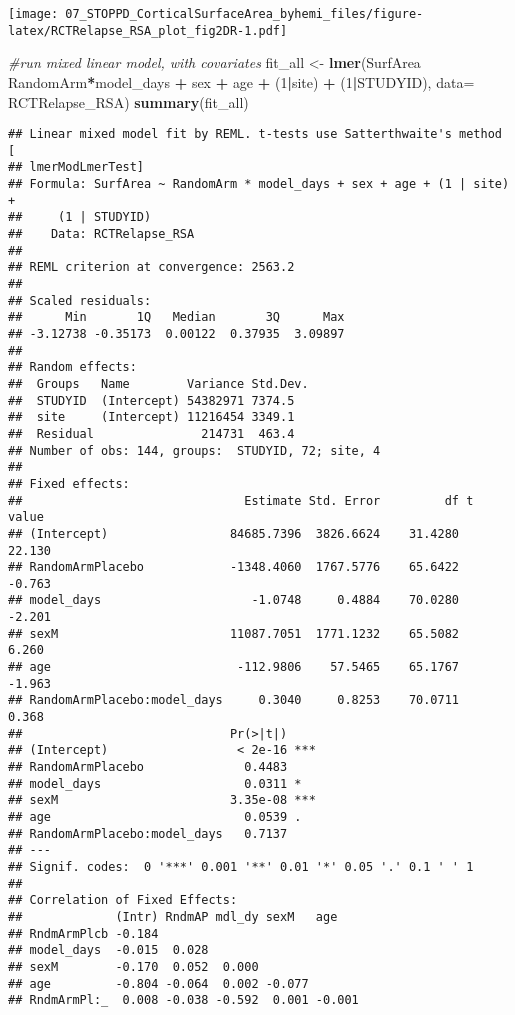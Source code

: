 \documentclass[]{article}
\newenvironment{Shaded}{\begin{snugshade}}{\end{snugshade}}
\newcommand{\KeywordTok}[1]{\textcolor[rgb]{0.13,0.29,0.53}{\textbf{#1}}}
\newcommand{\DataTypeTok}[1]{\textcolor[rgb]{0.13,0.29,0.53}{#1}}
\newcommand{\DecValTok}[1]{\textcolor[rgb]{0.00,0.00,0.81}{#1}}
\newcommand{\StringTok}[1]{\textcolor[rgb]{0.31,0.60,0.02}{#1}}
\newcommand{\CommentTok}[1]{\textcolor[rgb]{0.56,0.35,0.01}{\textit{#1}}}
\newcommand{\OperatorTok}[1]{\textcolor[rgb]{0.81,0.36,0.00}{\textbf{#1}}}
\newcommand{\NormalTok}[1]{#1}
\theoremstyle{definition}
\theoremstyle{definition}
\theoremstyle{definition}
\theoremstyle{remark}
\begin{document}
\texttt{[image: 07\_STOPPD\_CorticalSurfaceArea\_byhemi\_files/figure-latex/RCTRelapse\_RSA\_plot\_fig2DR-1.pdf]}

\begin{Shaded}
\begin{Highlighting}[]
\CommentTok{#run mixed linear model, with covariates}
\NormalTok{  fit_all <-}\StringTok{ }\KeywordTok{lmer}\NormalTok{(SurfArea }\OperatorTok{~}\StringTok{ }\NormalTok{RandomArm}\OperatorTok{*}\NormalTok{model_days }\OperatorTok{+}\StringTok{ }\NormalTok{sex }\OperatorTok{+}\StringTok{ }\NormalTok{age }\OperatorTok{+}\StringTok{ }\NormalTok{(}\DecValTok{1}\OperatorTok{|}\NormalTok{site) }\OperatorTok{+}\StringTok{ }\NormalTok{(}\DecValTok{1}\OperatorTok{|}\NormalTok{STUDYID), }\DataTypeTok{data=}\NormalTok{ RCTRelapse_RSA)}
  \KeywordTok{summary}\NormalTok{(fit_all)}
\end{Highlighting}
\end{Shaded}

\begin{verbatim}
## Linear mixed model fit by REML. t-tests use Satterthwaite's method [
## lmerModLmerTest]
## Formula: SurfArea ~ RandomArm * model_days + sex + age + (1 | site) +  
##     (1 | STUDYID)
##    Data: RCTRelapse_RSA
## 
## REML criterion at convergence: 2563.2
## 
## Scaled residuals: 
##      Min       1Q   Median       3Q      Max 
## -3.12738 -0.35173  0.00122  0.37935  3.09897 
## 
## Random effects:
##  Groups   Name        Variance Std.Dev.
##  STUDYID  (Intercept) 54382971 7374.5  
##  site     (Intercept) 11216454 3349.1  
##  Residual               214731  463.4  
## Number of obs: 144, groups:  STUDYID, 72; site, 4
## 
## Fixed effects:
##                               Estimate Std. Error         df t value
## (Intercept)                 84685.7396  3826.6624    31.4280  22.130
## RandomArmPlacebo            -1348.4060  1767.5776    65.6422  -0.763
## model_days                     -1.0748     0.4884    70.0280  -2.201
## sexM                        11087.7051  1771.1232    65.5082   6.260
## age                          -112.9806    57.5465    65.1767  -1.963
## RandomArmPlacebo:model_days     0.3040     0.8253    70.0711   0.368
##                             Pr(>|t|)    
## (Intercept)                  < 2e-16 ***
## RandomArmPlacebo              0.4483    
## model_days                    0.0311 *  
## sexM                        3.35e-08 ***
## age                           0.0539 .  
## RandomArmPlacebo:model_days   0.7137    
## ---
## Signif. codes:  0 '***' 0.001 '**' 0.01 '*' 0.05 '.' 0.1 ' ' 1
## 
## Correlation of Fixed Effects:
##             (Intr) RndmAP mdl_dy sexM   age   
## RndmArmPlcb -0.184                            
## model_days  -0.015  0.028                     
## sexM        -0.170  0.052  0.000              
## age         -0.804 -0.064  0.002 -0.077       
## RndmArmPl:_  0.008 -0.038 -0.592  0.001 -0.001
\end{verbatim}
\end{document}
